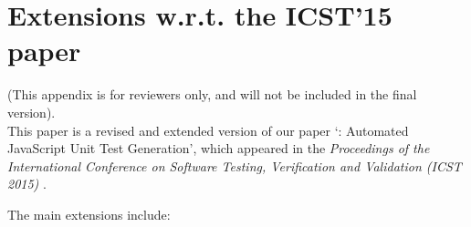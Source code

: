 \newpage
\section{Extensions w.r.t. the ICST'15 paper}
(This appendix is for reviewers only, and will not be included in the final version).\\

This paper is a revised and extended version of our paper `\tool: Automated JavaScript Unit Test Generation',  which appeared in the \emph{Proceedings of the International Conference on Software Testing, Verification and Validation (ICST 2015)} \cite{mirshokraie:icst15}.

The main extensions include:

